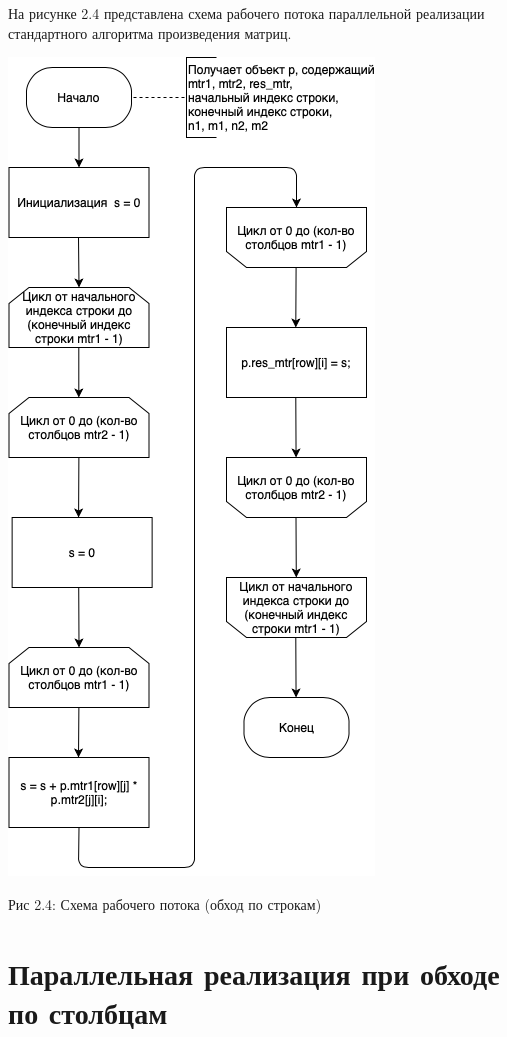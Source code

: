 \documentclass[12pt]{report}
\begin{document}
На рисунке 2.4 представлена схема рабочего потока параллельной реализации стандартного алгоритма произведения матриц.

\begin{center}
		\includegraphics[scale=0.6]{schema/ParRowWork.png}
		
			Рис 2.4: Схема рабочего потока (обход по строкам)
\end{center}

\newpage
\section{Параллельная реализация при обходе по столбцам}
\end{document}
